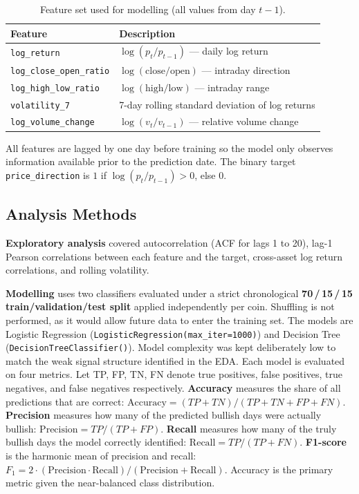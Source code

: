 \begin{table}[H]
  \centering
  \caption{Feature set used for modelling (all values from day $t-1$).}
  \label{tab:features}
  \begin{tabular}{@{}L{4cm}L{9cm}@{}}
    \toprule
    \textbf{Feature} & \textbf{Description} \\
    \midrule
    \texttt{log\_return}            & $\log(p_t / p_{t-1})$ — daily log return \\
    \texttt{log\_close\_open\_ratio}& $\log(\text{close} / \text{open})$ — intraday direction \\
    \texttt{log\_high\_low\_ratio}  & $\log(\text{high} / \text{low})$ — intraday range \\
    \texttt{volatility\_7}          & 7-day rolling standard deviation of log returns \\
    \texttt{log\_volume\_change}    & $\log(v_t / v_{t-1})$ — relative volume change \\
    \bottomrule
  \end{tabular}
\end{table}

All features are lagged by one day before training so the model only observes information available
prior to the prediction date.
The binary target \texttt{price\_direction} is $1$ if $\log(p_t / p_{t-1}) > 0$, else $0$.

\subsection{Analysis Methods}

\textbf{Exploratory analysis} covered autocorrelation (ACF for lags 1 to 20), lag-1 Pearson
correlations between each feature and the target, cross-asset log return correlations, and rolling
volatility.

\textbf{Modelling} uses two classifiers evaluated under a strict chronological
\textbf{70\,/\,15\,/\,15 train/validation/test split} applied independently per coin.
Shuffling is not performed, as it would allow future data to enter the training set.
The models are Logistic Regression (\texttt{LogisticRegression(max\_iter=1000)}) and Decision Tree
(\texttt{DecisionTreeClassifier()}).
Model complexity was kept deliberately low to match the weak signal structure identified in the EDA.
Each model is evaluated on four metrics. Let TP, FP, TN, FN denote true positives, false positives,
true negatives, and false negatives respectively.
\textbf{Accuracy} measures the share of all predictions that are correct:
$\text{Accuracy} = (TP + TN) / (TP + TN + FP + FN)$.
\textbf{Precision} measures how many of the predicted bullish days were actually bullish:
$\text{Precision} = TP / (TP + FP)$.
\textbf{Recall} measures how many of the truly bullish days the model correctly identified:
$\text{Recall} = TP / (TP + FN)$.
\textbf{F1-score} is the harmonic mean of precision and recall:
$F_1 = 2 \cdot (\text{Precision} \cdot \text{Recall}) / (\text{Precision} + \text{Recall})$.
Accuracy is the primary metric given the near-balanced class distribution.
